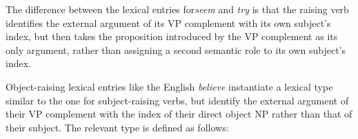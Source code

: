 \documentclass[12pt]{article}
\newcommand{\avmplus}[1]{{\setlength{\arraycolsep}{0.8mm}	
                       \renewcommand{\arraystretch}{1.1} %
                       \left[ 			
                       \begin{array}{l}
                       \\[-2mm] #1 \\[-2mm] \\
                       \end{array} 		
                       \right]
                    }}
\newcommand{\att}[1]{{\mbox{\scriptsize {\bf #1}}}}
\newcommand{\attval}[2]{{\mbox{\scriptsize #1}\ {{#2}}}}
\newcommand{\attvallist}[2]{{\mbox{\scriptsize #1}\ {<{#2}>}}}
\newcommand{\ind}[1]{{\setlength{\fboxsep}{0.25mm} \: \fbox{{\small #1}} \:}}
\begin{document}
{{%

}



The difference between the lexical entries for{\it seem} and {\it try} is
that the raising verb identifies the external argument of its VP complement
with its own subject's index, but then takes the proposition introduced by
the VP complement as its only argument, rather than assigning a second
semantic role to its own subject's index.

Object-raising lexical entries like the English {\it believe} instantiate
a lexical type similar to the one for subject-raising verbs, but identify 
the external argument of their VP complement with the index of their direct
object NP rather than that of their subject.  The relevant type is defined
as follows:

}
\end{document}
